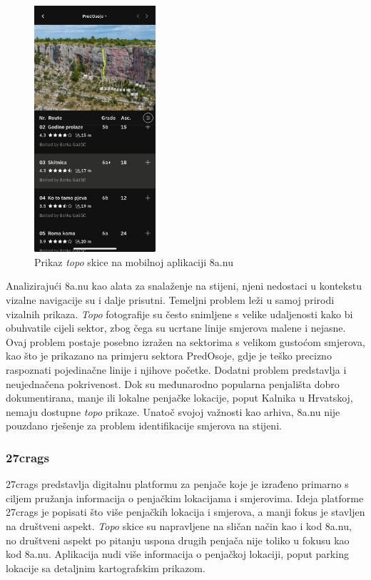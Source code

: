 \begin{figure}[H]
    \centering
    \includegraphics[width=0.4\textwidth]{images/analiza/8anu_mobile.jpg}
    \caption{Prikaz \textit{topo} skice na mobilnoj aplikaciji 8a.nu}
\end{figure}


Analizirajući 8a.nu kao alata za snalaženje na stijeni, njeni nedostaci u kontekstu vizalne navigacije su i dalje prisutni. Temeljni problem leži u samoj prirodi vizalnih prikaza. \textit{Topo} fotografije su često snimljene s velike udaljenosti kako bi obuhvatile cijeli sektor, zbog čega su ucrtane linije smjerova malene i nejasne. Ovaj problem postaje posebno izražen na sektorima s velikom gustoćom smjerova, kao što je prikazano na primjeru sektora PredOsoje, gdje je teško precizno raspoznati pojedinačne linije i njihove početke. Dodatni problem predstavlja i neujednačena pokrivenost. Dok su međunarodno popularna penjališta dobro dokumentirana, manje ili lokalne penjačke lokacije, poput Kalnika u Hrvatskoj, nemaju dostupne \textit{topo} prikaze. Unatoč svojoj važnosti kao arhiva, 8a.nu nije pouzdano rješenje za problem identifikacije smjerova na stijeni.

\subsubsection{27crags}

27crags predstavlja digitalnu platformu za penjače koje je izrađeno primarno s ciljem pružanja informacija o penjačkim lokacijama i smjerovima. Ideja platforme 27crags je popisati što više penjačkih lokacija i smjerova, a manji fokus je stavljen na društveni aspekt. \textit{Topo} skice su napravljene na sličan način kao i kod 8a.nu, no društveni aspekt po pitanju uspona drugih penjača nije toliko u fokusu kao kod 8a.nu. Aplikacija nudi više informacija o penjačkoj lokaciji, poput parking lokacije sa detaljnim kartografskim prikazom.


